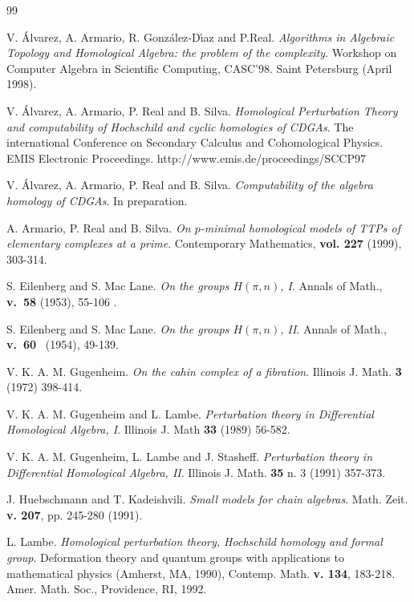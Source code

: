 \begin{thebibliography}{99}

V. \'{A}lvarez, A. Armario, R. Gonz\'{a}lez-D\'{\i}az and
P.Real. {\it Algorithms in Algebraic Topology and Homological
Algebra: the problem of the complexity}.
Workshop on Computer Algebra in Scientific Computing, CASC'98.
Saint Petersburg (April 1998).

 V. \'{A}lvarez, A. Armario, P. Real and B. Silva.
{\it Homological Perturbation Theory and computability of
Hochschild and cyclic homologies of CDGAs}. The international
Conference on Secondary Calculus and Cohomological Physics. EMIS
Electronic Proceedings. http://www.emis.de/proceedings/SCCP97

V. \'{A}lvarez, A. Armario, P. Real and B. Silva.
{\it Computability of the algebra homology of CDGAs}. In
preparation.


 A. Armario, P. Real and B. Silva. {\it On $p$-minimal
homological models of TTPs of elementary complexes at a prime}.
Contemporary Mathematics, {\bf vol. 227} (1999), 303-314.

 S.  Eilenberg   and S. Mac
Lane. {\em On the groups $H(\pi,n)$, I}. Annals of Math., \mbox{\bf v.
 58} (1953), 55-106 .

 S. Eilenberg and S. Mac Lane. {\em On the groups
$H(\pi,n)$, II}. Annals of Math., \mbox{\bf v. 60 } (1954), 49-139.



 V. K. A. M. Gugenheim. {\it On the cahin complex of a
fibration}. Illinois J. Math. {\bf 3} (1972) 398-414.

 V. K. A. M. Gugenheim and L. Lambe. {\it Perturbation
theory in Differential Homological Algebra, I}. Illinois J. Math
{\bf 33} (1989) 56-582.

 V. K. A. M. Gugenheim, L. Lambe and J. Stasheff.
{\it Perturbation theory in Differential Homological Algebra, II}.
Illinois J. Math. {\bf 35} n. 3 (1991) 357-373.

 J. Huebschmann and T. Kadeishvili. {\em Small models for
chain algebras}. Math. Zeit. {\bf v. 207}, pp. 245-280 (1991).


 L. Lambe. {\em Homological perturbation theory,
Hochschild homology and formal group}.
Deformation theory and quantum groups with applications to
mathematical physics (Amherst, MA, 1990), Contemp. Math.
{\bf v. 134}, 183-218. Amer. Math. Soc., Providence, RI, 1992.



\end{thebibliography}
